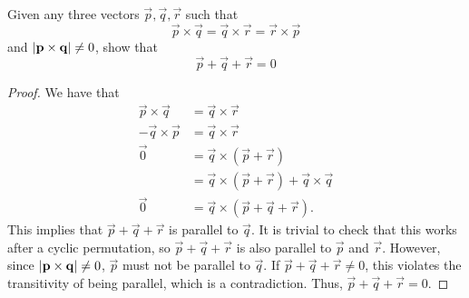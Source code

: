 \documentclass[12pt]{article}
\begin{document}
    \begin{subquestion}
        Given any three vectors $\vec{p},\vec{q},\vec{r}$ such that
        \[
        \vec{p}\times\vec{q} = \vec{q}\times\vec{r} = \vec{r}\times\vec{p}
        \]
        and $\left\lvert \mathbf{p}\times\mathbf{q} \right\rvert \ne 0$, show that
        \[
        \vec{p}+\vec{q}+\vec{r}=0
        \]
    \end{subquestion}
    \begin{proof}
        We have that
        \begin{align*}
            \vec{p}\times\vec{q} &= \vec{q}\times\vec{r}\\
            -\vec{q}\times\vec{p} &= \vec{q}\times\vec{r}\\
            \vec{0} &= \vec{q}\times(\vec{p}+\vec{r})\\
            &= \vec{q}\times(\vec{p}+\vec{r})+\vec{q}\times\vec{q}\\
            \vec{0} &= \vec{q}\times(\vec{p}+\vec{q}+\vec{r}).
        \end{align*}
        This implies that $\vec{p}+\vec{q}+\vec{r}$ is 
        parallel to $\vec{q}$. It is trivial to check that this works after
        a cyclic permutation, so $\vec{p}+\vec{q}+\vec{r}$ is also
        parallel to $\vec{p}$ and $\vec{r}$.
        However, since $\left\lvert \mathbf{p}\times\mathbf{q} \right\rvert\ne 0$, 
        $\vec{p}$ must not be parallel to $\vec{q}$.
        If $\vec{p}+\vec{q}+\vec{r}\ne 0$, this violates the transitivity of being parallel,
        which is a contradiction.
        Thus, $\vec{p}+\vec{q}+\vec{r}=0$.
    \end{proof}
\end{document}
